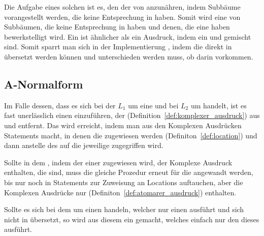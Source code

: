 Die Aufgabe eines solchen  ist es, den  der  von  anzunähren, indem Subbäume vorangestellt werden, die keine Entsprechung in  haben. Somit wird eine  von Subbäumen, die keine Entsprechung in  haben und denen, die eine haben bewerkstelligt wird. Ein  ist  ähnlicher als ein Ausdruck, indem ein  und   gemischt sind. Somit sparrt man sich in der Implementierung , indem die  direkt in  übersetzt werden können und  unterschieden werden muss, ob darin  vorkommen.

\subsection{A-Normalform}
\label{sec:a_normalform}

Im Falle dessen, dass es sich bei der  $L_1$ um eine  und bei $L_2$ um  handelt, ist es fast unerlässlich einen  einzuführen, der  (Definition~\ref{def:komplexer_ausdruck}) aus  und  entfernt. Das wird erreicht, indem man aus den Komplexen Ausdrücken  Statements macht, in denen die   zugewiesen werden (Definiton~\ref{def:location}) und dann anstelle des  auf die jeweilige  zugegriffen wird.

Sollte in dem , indem der  einer  zugewiesen wird, der Komplexe Ausdruck  enthalten, die  sind, muss die gleiche Prozedur erneut für die  angewandt werden, bis  nur noch in Statements zur Zuweisung an Locations auftauchen, aber die Komplexen Ausdrücke nur  (Definiton~\ref{def:atomarer_ausdruck}) enthalten.

Sollte es sich bei dem  um einen  handeln, welcher nur einen  ausführt und sich nicht in  übersetzt, so wird aus diesem ein  gemacht, welches einfach nur den  dieses  ausführt.

